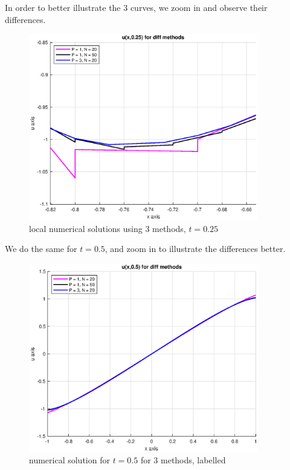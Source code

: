 \documentclass[12pt]{article} %
\newcommand{\1}[1]{\mathds{1}\left[#1\right]}
\begin{document}
In order to better illustrate the 3 curves, we zoom in and observe their differences.

\begin{figure}[t]
\includegraphics[width=10cm]{zoom1.eps}
\centering
\caption{local numerical solutions using 3 methods, $t = 0.25$}
\end{figure}

\newpage
We do the same for $t = 0.5$, and zoom in to illustrate the differences better.
\newpage
\begin{figure}[t]
\includegraphics[width=10cm]{p3cp5.eps}
\centering
\caption{numerical solution for $t = 0.5$ for 3 methods, labelled}
\end{figure}
\end{document}
